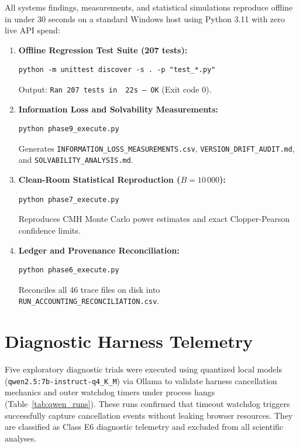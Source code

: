 \documentclass[conference]{IEEEtran}
\begin{document}
All systems findings, measurements, and statistical simulations reproduce offline in under 30 seconds on a standard Windows host using Python 3.11 with zero live API spend:
\begin{enumerate}
    \item \textbf{Offline Regression Test Suite (207 tests):}
\begin{lstlisting}
python -m unittest discover -s . -p "test_*.py"
\end{lstlisting}
    Output: \texttt{Ran 207 tests in ~22s --- OK} (Exit code 0).
    \item \textbf{Information Loss and Solvability Measurements:}
\begin{lstlisting}
python phase9_execute.py
\end{lstlisting}
    Generates \texttt{INFORMATION\_LOSS\_MEASUREMENTS.csv}, \texttt{VERSION\_DRIFT\_AUDIT.md}, and \texttt{SOLVABILITY\_ANALYSIS.md}.
    \item \textbf{Clean-Room Statistical Reproduction ($B=10\,000$):}
\begin{lstlisting}
python phase7_execute.py
\end{lstlisting}
    Reproduces CMH Monte Carlo power estimates and exact Clopper-Pearson confidence limits.
    \item \textbf{Ledger and Provenance Reconciliation:}
\begin{lstlisting}
python phase6_execute.py
\end{lstlisting}
    Reconciles all 46 trace files on disk into \texttt{RUN\_ACCOUNTING\_RECONCILIATION.csv}.
\end{enumerate}

\FloatBarrier

\section{Diagnostic Harness Telemetry}
\label{app:local_diagnostics}

Five exploratory diagnostic trials were executed using quantized local models (\texttt{qwen2.5:7b-instruct-q4\_K\_M}) via Ollama to validate harness cancellation mechanics and outer watchdog timers under process hangs (Table~\ref{tab:qwen_runs}). These runs confirmed that timeout watchdog triggers successfully capture cancellation events without leaking browser resources. They are classified as Class E6 diagnostic telemetry and excluded from all scientific analyses.
\end{document}
